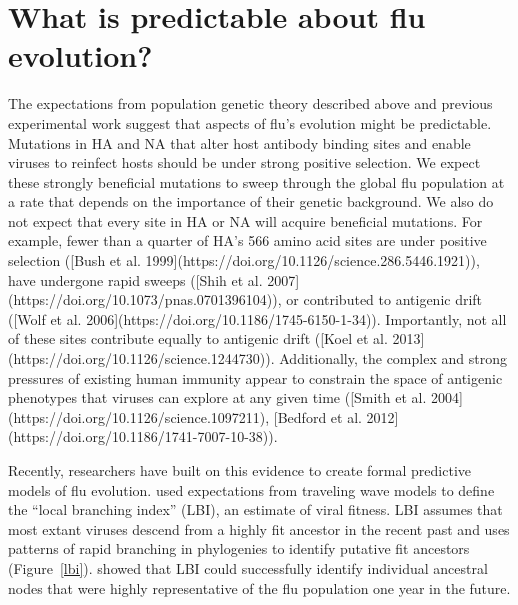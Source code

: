 \section{What is predictable about flu evolution?}

The expectations from population genetic theory described above and previous experimental work suggest that aspects of flu's evolution might be predictable.
Mutations in HA and NA that alter host antibody binding sites and enable viruses to reinfect hosts should be under strong positive selection.
We expect these strongly beneficial mutations to sweep through the global flu population at a rate that depends on the importance of their genetic background.
We also do not expect that every site in HA or NA will acquire beneficial mutations.
For example, fewer than a quarter of HA's 566 amino acid sites are under positive selection ([Bush et al. 1999](https://doi.org/10.1126/science.286.5446.1921)), have undergone rapid sweeps ([Shih et al. 2007](https://doi.org/10.1073/pnas.0701396104)), or contributed to antigenic drift ([Wolf et al. 2006](https://doi.org/10.1186/1745-6150-1-34)).
Importantly, not all of these sites contribute equally to antigenic drift ([Koel et al. 2013](https://doi.org/10.1126/science.1244730)).
Additionally, the complex and strong pressures of existing human immunity appear to constrain the space of antigenic phenotypes that viruses can explore at any given time ([Smith et al. 2004](https://doi.org/10.1126/science.1097211), [Bedford et al. 2012](https://doi.org/10.1186/1741-7007-10-38)).

Recently, researchers have built on this evidence to create formal predictive models of flu evolution.
\citet{Neher:2014eu} used expectations from traveling wave models to define the ``local branching index'' (LBI), an estimate of viral fitness.
LBI assumes that most extant viruses descend from a highly fit ancestor in the recent past and uses patterns of rapid branching in phylogenies to identify putative fit ancestors (Figure~\ref{lbi}).
\citet{Neher:2014eu} showed that LBI could successfully identify individual ancestral nodes that were highly representative of the flu population one year in the future.


